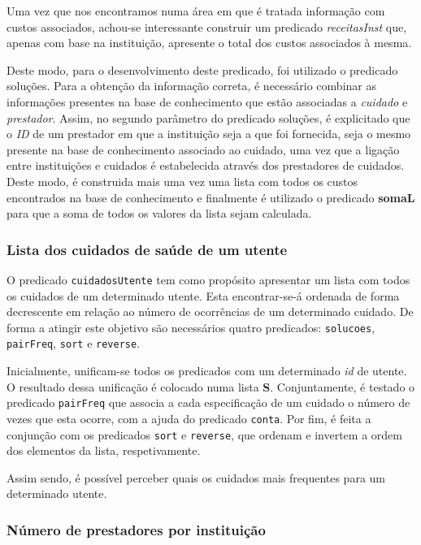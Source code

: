 \documentclass[a4paper]{article}
\begin{document}
\hspace{3mm} Uma vez que nos encontramos numa área em que é tratada informação com custos associados, achou-se interessante construir um predicado \textit{receitasInst} que, apenas com base na instituição, apresente o total dos custos associados à mesma.
\par Deste modo, para o desenvolvimento deste predicado, foi utilizado o predicado soluções. Para a obtenção da informação correta, é necessário combinar as informações presentes na base de conhecimento que estão associadas a \emph{cuidado} e \emph{prestador}. Assim, no segundo parâmetro do predicado soluções, é explicitado que o \emph{ID} de um prestador em que a instituição seja a que foi fornecida, seja o mesmo presente na base de conhecimento associado ao cuidado, uma vez que a ligação entre instituições e cuidados é estabelecida através dos prestadores de cuidados. Deste modo, é construida mais uma vez uma lista com todos os custos encontrados na base de conhecimento e finalmente é utilizado o predicado \textbf{somaL} para que a soma de todos os valores da lista sejam calculada.

\subsubsection{Lista dos cuidados de saúde de um utente}

\hspace{3mm} O predicado \texttt{cuidadosUtente} tem como propósito apresentar um lista com todos os cuidados de um determinado utente. Esta encontrar-se-á ordenada de forma decrescente em relação ao número de ocorrências de um determinado cuidado. De forma a atingir este objetivo são necessários quatro predicados: \texttt{solucoes}, \texttt{pairFreq}, \texttt{sort} e \texttt{reverse}.

Inicialmente, unificam-se todos os predicados com um determinado \textit{id} de utente. O resultado dessa unificação é colocado numa lista \textbf{S}. Conjuntamente, é testado o predicado \texttt{pairFreq} que associa a cada especificação de um cuidado o número de vezes que esta ocorre, com a ajuda do predicado \texttt{conta}. Por fim, é feita a conjunção com os predicados \texttt{sort} e \texttt{reverse}, que ordenam e invertem a ordem dos elementos da lista, respetivamente.

Assim sendo, é possível perceber quais os cuidados mais frequentes para um determinado utente.

\subsubsection{Número de prestadores por instituição}
\end{document}
